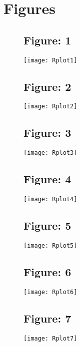 \documentclass{article}
\begin{document}
\newpage
\section{Figures}

\begin{figure}[ht!]
\subsection{Figure: 1}
\centering
\texttt{[image: Rplot1]}
\end{figure}

\begin{figure}[ht!]
\subsection{Figure: 2}
\centering
\texttt{[image: Rplot2]}
\end{figure}

\begin{figure}[ht!]
\subsection{Figure: 3}
\centering
\texttt{[image: Rplot3]}
\end{figure}

\begin{figure}[ht!]
\subsection{Figure: 4}
\centering
\texttt{[image: Rplot4]}
\end{figure}

\begin{figure}[ht!]
\subsection{Figure: 5}
\centering
\texttt{[image: Rplot5]}
\end{figure}

\begin{figure}[ht!]
\subsection{Figure: 6}
\centering
\texttt{[image: Rplot6]}
\end{figure}

\begin{figure}[ht!]
\subsection{Figure: 7}
\centering
\texttt{[image: Rplot7]}
\end{figure}
\end{document}
